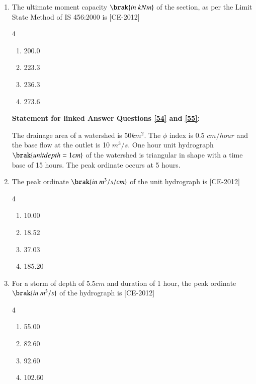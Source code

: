 \documentclass[journal]{IEEEtran}
\begin{document}
\begin{enumerate}
    \item The ultimate moment capacity $\brak{in \ kNm}$ of the section, as per the Limit State Method of IS 456:2000 is \hfill{[CE-2012]}
    \begin{multicols}{4} 
    \begin{enumerate}
        \item 200.0
        \item 223.3
        \item 236.3
        \item 273.6
        
    \end{enumerate}
    \end{multicols}
		\textbf{Statement for linked Answer Questions \ref{54}  and \ref{55}:} 

The drainage area of a watershed is 50$km^2$. The $\phi$ index is 0.5 $cm/hour$ and the base flow at the outlet is 10 $m^3/s$. One hour unit hydrograph $\brak{unit depth = 1 cm}$ of the watershed is triangular in shape with a time base of 15 hours. The peak ordinate occurs at 5 hours. 
	
\item The peak ordinate  $\brak{in \ m^3/s/cm}$ of the unit hydrograph is \label{54}     \hfill{[CE-2012]} 
\begin{multicols}{4}
\begin{enumerate}
    \item 10.00
    \item 18.52
    \item 37.03
    \item 185.20
\end{enumerate}
    
\end{multicols}
\item For a storm of depth of 5.5$cm$ and duration of 1 hour, the peak ordinate $\brak{in \ m^3/s}$ of the hydrograph is \label{55} \hfill{[CE-2012]}
\begin{multicols}{4} 
\begin{enumerate}
    \item 55.00
    \item 82.60
    \item 92.60
    \item 102.60
\end{enumerate}
    
\end{multicols}
		

\end{enumerate}
\end{document}
